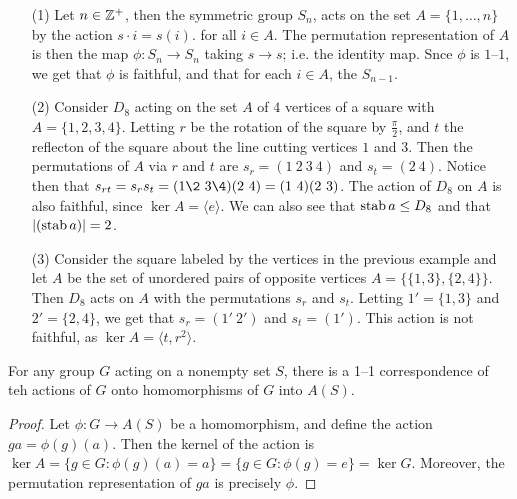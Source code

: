 \begin{example}\label{example_4.3}
  \begin{enumerate}
    \item[(1)] Let $n \in \mathbb{Z}^+$, then the symmetric group $S_n$, acts on the
      set $A=\{1, \dots, n\}$ by the action $s \cdot i=s(i)$. for all $i
      \in A$. The permutation representation of $A$ is then the map
      $\phi:S_n \rightarrow S_n$ taking $s \rightarrow s$; i.e. the
      identity map. Snce $\phi$ is  $1$--$1$, we get that $\phi$ is
      faithful, and that for each $i \in A$, the  \simeq
      $S_{n-1}$.

    \item[(2)] Consider $D_8$ acting on the set $A$ of  $4$ vertices of a
      square with  $A=\{1,2,3,4\}$. Letting $r$ be the rotation of the square
      by  $\frac{\pi}{2}$, and $t$ the reflecton of the square about the
      line cutting vertices $1$ and $3$. Then the permutations of $A$ via
      $r$ and  $t$ are  $s_r=(1 \ 2 \ 3 \ 4)$ and $s_t = (2 \ 4)$. Notice then
      that $s_{rt}=s_rs_t=(1 \2 \ 3 \4)(2 \ 4)=(1 \ 4)(2 \ 3)$. The action of
      $D_8$ on $A$ is also faithful, since  $\ker{A}=\langle e \rangle$. We can also
      see that $\operatorname{stab}{a} \leq D_8$ and that $|(\operatorname{stab}{a})|=2$.

    \item[(3)] Consider the square labeled by the vertices in the
      previous example and let $A$ be the set of unordered pairs of opposite
      vertices  $A=\{\{1,3\}, \{2,4\}\}$. Then $D_8$ acts on $A$ with the
      permutations $s_r$ and  $s_t$. Letting  $1'=\{1,3\}$ and $2'=\{2,4\}$,
      we get that $s_r=(1' \ 2')$ and $s_t=(1')$. This action is not faithful,
      as $\ker{A}=\langle t ,r^2 \rangle$.
  \end{enumerate}
\end{example}

\begin{theorem}\label{proposition_4.1.3}
  For any group $G$ acting on a nonempty set $S$, there is a 1--1 correspondence
  of teh actions of  $G$ onto homomorphisms of  $G$ into $A(S)$.
\end{theorem}
\begin{proof}
  Let $\phi:G \rightarrow A(S)$ be a homomorphism, and define the action
  $ga=\phi(g)(a)$. Then the kernel of the action is $\ker{A}=\{g \in G :
  \phi(g)(a)=a\}=\{g \in G : \phi(g)=e\}=\ker{G}$. Moreover, the permutation
  representation of $ga$ is precisely  $\phi$.
\end{proof}

